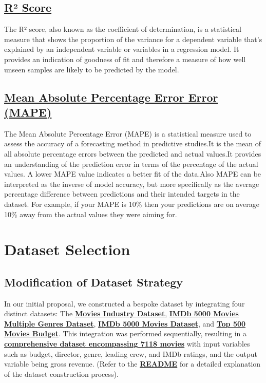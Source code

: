 \documentclass[conference]{IEEEtran}
\begin{document}
    \subsection*{\href{https://en.wikipedia.org/wiki/Coefficient_of_determination}{R² Score}}
        The R² score, also known as the coefficient of determination, is a statistical measure that shows the proportion of the variance for a dependent variable that's explained by an independent variable or variables in a regression model. It provides an indication of goodness of fit and therefore a measure of how well unseen samples are likely to be predicted by the model.

    \subsection*{\href{https://stephenallwright.com/interpret-mape/}{Mean Absolute Percentage Error Error (MAPE)}}
        The Mean Absolute Percentage Error (MAPE) is a statistical measure used to assess the accuracy of a forecasting method in predictive studies.It is the mean of all absolute percentage errors between the predicted and actual values.It provides an understanding of the prediction error in terms of the percentage of the actual values. A lower MAPE value indicates a better fit of the data.Also MAPE can be interpreted as the inverse of model accuracy, but more specifically as the average percentage difference between predictions and their intended targets in the dataset. For example, if your MAPE is 10\% then your predictions are on average 10\% away from the actual values they were aiming for.

\section{Dataset Selection}
     \subsection{Modification of Dataset Strategy}
        In our initial proposal, we constructed a bespoke dataset by integrating four distinct datasets: The \href{https://www.kaggle.com/datasets/danielgrijalvas/movies}{\textbf{Movies Industry Dataset}}, \href{https://www.kaggle.com/datasets/rakkesharv/imdb-5000-movies-multiple-genres-dataset}{\textbf{IMDb 5000 Movies Multiple Genres Dataset}}, \href{https://www.kaggle.com/datasets/carolzhangdc/imdb-5000-movie-dataset}{\textbf{IMDb 5000 Movies Dataset}}, and \href{https://www.kaggle.com/datasets/mitchellharrison/top-500-movies-budget}{\textbf{Top 500 Movies Budget}}. This integration was performed sequentially, resulting in a \href{https://github.com/Vikranth3140/Movie-Revenue-Prediction/blob/main/old%20datasets/final_dataset.csv}{\textbf{comprehensive dataset encompassing 7118 movies}} with input variables such as budget, director, genre, leading crew, and IMDb ratings, and the output variable being gross revenue. (Refer to the \href{https://github.com/Vikranth3140/Movie-Revenue-Prediction/blob/main/old%20datasets/README.md}{\textbf{README}} for a detailed explanation of the dataset construction process).
\end{document}
